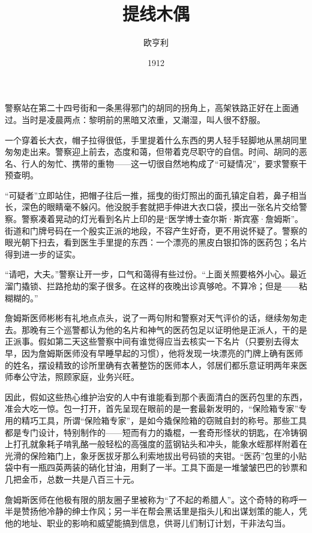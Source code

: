 \documentclass{article}
\title{提线木偶}
\author{欧亨利}
\date{1912}
\begin{document}



\Large

警察站在第二十四号街和一条黑得邪门的胡同的拐角上，高架铁路正好在上面通过。当时是凌晨两点：黎明前的黑暗又浓重，又潮湿，叫人很不舒服。



一个穿着长大衣，帽子拉得很低，手里提着什么东西的男人轻手轻脚地从黑胡同里匆匆走出来。警察迎上前去，态度和蔼，但带着克尽职守的自信。时间、胡同的恶名、行人的匆忙、携带的重物——这一切很自然地构成了“可疑情况”，要求警察干预查明。



“可疑者”立即站住，把帽子往后一推，摇曳的街灯照出的面孔镇定自若，鼻子相当长，深色的眼睛毫不躲闪。他没脱手套就把手伸进大衣口袋，摸出一张名片交给警察。警察凑着晃动的灯光看到名片上印的是“医学博士查尔斯·斯宾塞·詹姆斯”。街道和门牌号码在一个殷实正派的地段，不容产生好奇，更不用说怀疑了。警察的眼光朝下扫去，看到医生手里提的东西：一个漂亮的黑皮白银扣饰的医药包；名片得到进一步的证实。



“请吧，大夫。”警察让开一步，口气和蔼得有些过份。“上面关照要格外小心。最近溜门撬锁、拦路抢劫的案子很多。在这样的夜晚出诊真够呛。不算冷；但是——粘糊糊的。”



詹姆斯医师彬彬有礼地点点头，说了一两句附和警察对天气评价的话，继续匆匆走去。那晚有三个巡警都认为他的名片和神气的医药包足以证明他是正派人，干的是正派事。假如第二天这些警察中间有谁觉得应当去核实一下名片（只要别去得太早，因为詹姆斯医师没有早睡早起的习惯），他将发现一块漂亮的门牌上确有医师的姓名，摆设精致的诊所里确有衣著整饬的医师本人，邻居们都乐意证明两年来医师奉公守法，照顾家庭，业务兴旺。



因此，假如这些热心维护治安的人中有谁能看到那个表面清白的医药包里的东西，准会大吃一惊。包一打开，首先呈现在眼前的是一套最新发明的，“保险箱专家”专用的精巧工具，所谓“保险箱专家”，是如今撬保险箱的窃贼自封的称号。那些工具都是专门设计，特别制作的——短而有力的撬棍，一套奇形怪状的钥匙，在冷铸钢上打孔就象耗子啃乳酪一般轻松的高强度的蓝钢钻头和冲头，能象水蛭那样附着在光滑的保险箱门上，象牙医拔牙那么利索地拔出号码锁的夹钳。“医药”包里的小贴袋中有一瓶四英两装的硝化甘油，用剩了一半。工具下面是一堆皱皱巴巴的钞票和几把金币，总数一共是八百三十元。



詹姆斯医师在他极有限的朋友圈子里被称为“了不起的希腊人”。这个奇特的称呼一半是赞扬他冷静的绅士作风；另一半在帮会黑话里是指头儿和出谋划策的能人，凭他的地址、职业的影响和威望能搞到信息，供哥儿们制订计划，干非法勾当。
\end{document}
